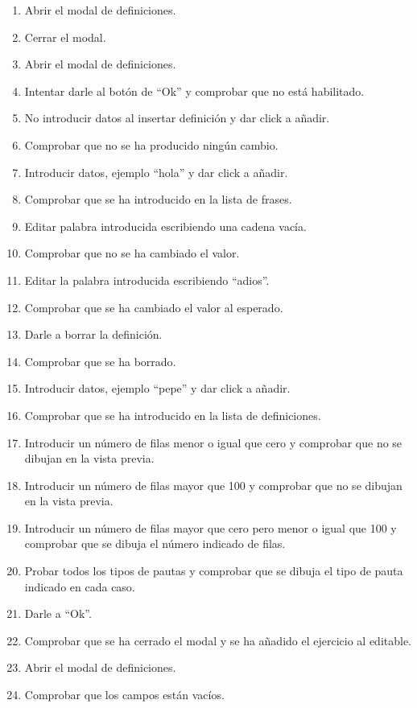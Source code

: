 \begin{enumerate}
    \item Abrir el modal de definiciones.
    \item Cerrar el modal.
    \item Abrir el modal de definiciones.
    \item Intentar darle al botón de ``Ok'' y comprobar que no está habilitado.
    \item No introducir datos al insertar definición y dar click a añadir.
    \item Comprobar que no se ha producido ningún cambio.
    \item Introducir datos, ejemplo ``hola'' y dar click a añadir.
    \item Comprobar que se ha introducido en la lista de frases.
    \item Editar palabra introducida escribiendo una cadena vacía.
    \item Comprobar que no se ha cambiado el valor.
    \item Editar la palabra introducida escribiendo ``adios''.
    \item Comprobar que se ha cambiado el valor al esperado.
    \item Darle a borrar la definición.
    \item Comprobar que se ha borrado.
    \item Introducir datos, ejemplo ``pepe'' y dar click a añadir.
    \item Comprobar que se ha introducido en la lista de definiciones.
    \item Introducir un número de filas menor o igual que cero y comprobar que no se dibujan en la vista previa.
    \item Introducir un número de filas mayor que 100 y comprobar que no se dibujan en la vista previa.
    \item Introducir un número de filas mayor que cero pero menor o igual que 100 y comprobar que se dibuja el número indicado de filas.
    \item Probar todos los tipos de pautas y comprobar que se dibuja el tipo de pauta indicado en cada caso.
    \item Darle a ``Ok''.
    \item Comprobar que se ha cerrado el modal y se ha añadido el ejercicio al editable.
    \item Abrir el modal de definiciones.
    \item Comprobar que los campos están vacíos.
\end{enumerate}

